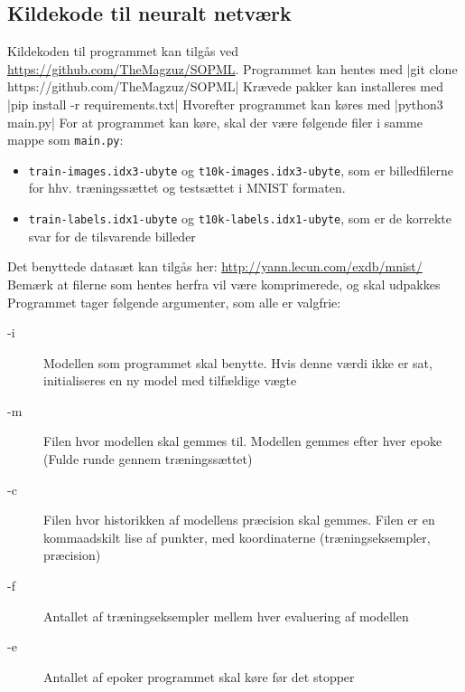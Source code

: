 \documentclass[a4paper, 12pt]{article}
\theoremstyle{definition}
\begin{document}
\subsection{Kildekode til neuralt netværk} \label{bil:source}
Kildekoden til programmet kan tilgås ved \url{https://github.com/TheMagzuz/SOPML}. Programmet kan hentes med
|git clone https://github.com/TheMagzuz/SOPML|
Krævede pakker kan installeres med
|pip install -r requirements.txt|
Hvorefter programmet kan køres med
|python3 main.py|
For at programmet kan køre, skal der være følgende filer i samme mappe som \texttt{main.py}:
\begin{itemize}
  \item \texttt{train-images.idx3-ubyte} og \texttt{t10k-images.idx3-ubyte}, som er billedfilerne for hhv. træningssættet og testsættet i MNIST formaten.
  \item \texttt{train-labels.idx1-ubyte} og \texttt{t10k-labels.idx1-ubyte}, som er de korrekte svar for de tilsvarende billeder
\end{itemize}
Det benyttede datasæt kan tilgås her: \url{http://yann.lecun.com/exdb/mnist/}
Bemærk at filerne som hentes herfra vil være komprimerede, og skal udpakkes
Programmet tager følgende argumenter, som alle er valgfrie:
\begin{description}
  \item[-i] Modellen som programmet skal benytte. Hvis denne værdi ikke er sat, initialiseres en ny model med tilfældige vægte
  \item[-m] Filen hvor modellen skal gemmes til. Modellen gemmes efter hver epoke (Fulde runde gennem træningssættet)
  \item[-c] Filen hvor historikken af modellens præcision skal gemmes. Filen er en kommaadskilt lise af punkter, med koordinaterne (træningseksempler, præcision)
  \item[-f] Antallet af træningseksempler mellem hver evaluering af modellen
  \item[-e] Antallet af epoker programmet skal køre før det stopper
\end{description}
\end{document}
